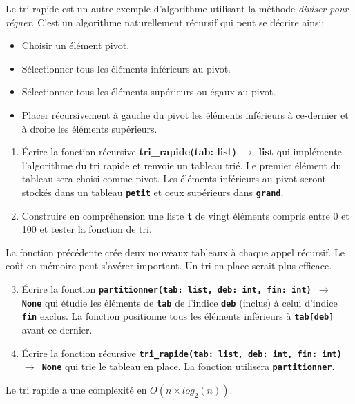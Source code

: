 \documentclass[a4paper,11pt]{article}
\begin{document}
    \begin{exo}
        Le tri rapide est un autre exemple d'algorithme utilisant la méthode \emph{diviser pour régner}. C'est un algorithme naturellement récursif qui peut se décrire ainsi:
        \begin{itemize}
        \item Choisir un élément pivot.
        \item Sélectionner tous les éléments inférieurs au pivot.
        \item Sélectionner tous les éléments supérieurs ou égaux au pivot.
        \item Placer récursivement à gauche du pivot les éléments inférieurs à ce-dernier et à droite les éléments supérieurs.
        \end{itemize}
        \begin{enumerate}
        \item Écrire la fonction récursive \textbf{tri\_rapide(tab: list) $\rightarrow$ list} qui implémente l'algorithme du tri rapide et renvoie un tableau trié. Le premier élément du tableau sera choisi comme pivot. Les éléments inférieurs au pivot seront stockés dans un tableau \textbf{\texttt{petit}} et ceux supérieurs dans \textbf{\texttt{grand}}.
        \item Construire en compréhension une liste \textbf{\texttt{t}} de vingt éléments compris entre 0 et 100 et tester la fonction de tri.
        \end{enumerate}
        La fonction précédente crée deux nouveaux tableaux à chaque appel récursif. Le coût en mémoire peut s'avérer important. Un tri en place serait plus efficace.
        \begin{enumerate}
            \setcounter{enumi}{2}
            \item Écrire la fonction \textbf{\texttt{partitionner(tab: list, deb: int, fin: int) $\rightarrow$ None}} qui étudie les éléments de \textbf{\texttt{tab}} de l'indice \textbf{\texttt{deb}} (inclus) à celui d'indice \textbf{\texttt{fin}} exclus. La fonction positionne tous les éléments inférieurs à \textbf{\texttt{tab[deb]}} avant ce-dernier.
            \item Écrire la fonction récursive \textbf{\texttt{tri\_rapide(tab: list, deb: int, fin: int) $\rightarrow$ None}} qui trie le tableau en place. La fonction utilisera \textbf{\texttt{partitionner}}.
        \end{enumerate}
        \begin{aretenir}[Remarque]\centering
            Le tri rapide a une complexité en $O(n×log_2(n))$.
        \end{aretenir}
        \end{exo}
\end{document}
